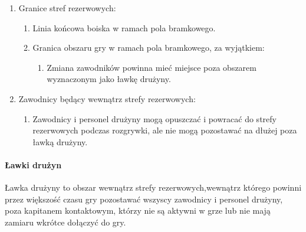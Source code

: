 \documentclass[12pt]{article}
\begin{document}
\begin{enumerate}
	\item Granice stref rezerwowych:
	      \begin{enumerate}
		      \item Linia końcowa boiska w ramach pola bramkowego.

		      \item Granica obszaru gry w ramach pola bramkowego, za wyjątkiem:
		            \begin{enumerate}
			            \item Zmiana zawodników powinna mieć miejsce poza obszarem wyznaczonym jako
			                  ławkę drużyny.
		            \end{enumerate}
	      \end{enumerate}

	\item Zawodnicy będący wewnątrz strefy rezerwowych:
	      \begin{enumerate}
		      \item Zawodnicy i personel drużyny mogą opuszczać i powracać do strefy
		            rezerwowych podczas rozgrywki, ale nie mogą pozostawać na dłużej poza
		            ławką drużyny.
	      \end{enumerate}
\end{enumerate}

\paragraph{Ławki drużyn}
Ławka drużyny to obszar wewnątrz strefy
rezerwowych,wewnątrz którego powinni przez większość czasu gry
pozostawać wszyscy zawodnicy i personel drużyny, poza kapitanem
kontaktowym, którzy nie są aktywni w grze lub nie mają zamiaru wkrótce
dołączyć do gry.
\end{document}
